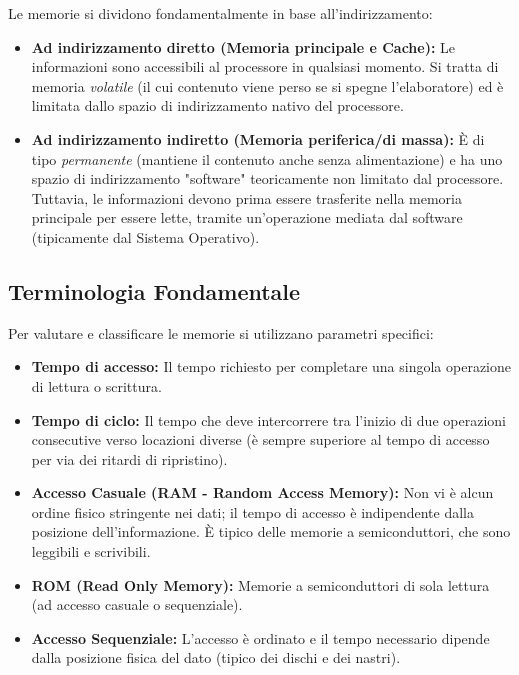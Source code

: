 \documentclass[12pt, a4paper]{article}
\begin{document}
Le memorie si dividono fondamentalmente in base all'indirizzamento:

\newpage

\begin{itemize}
    \item \textbf{Ad indirizzamento diretto (Memoria principale e Cache):} Le informazioni sono accessibili al processore in qualsiasi momento. Si tratta di memoria \textit{volatile} (il cui contenuto viene perso se si spegne l'elaboratore) ed è limitata dallo spazio di indirizzamento nativo del processore.
    \item \textbf{Ad indirizzamento indiretto (Memoria periferica/di massa):} È di tipo \textit{permanente} (mantiene il contenuto anche senza alimentazione) e ha uno spazio di indirizzamento "software" teoricamente non limitato dal processore. Tuttavia, le informazioni devono prima essere trasferite nella memoria principale per essere lette, tramite un'operazione mediata dal software (tipicamente dal Sistema Operativo).
\end{itemize}

\subsection{Terminologia Fondamentale}
Per valutare e classificare le memorie si utilizzano parametri specifici:
\begin{itemize}
    \item \textbf{Tempo di accesso:} Il tempo richiesto per completare una singola operazione di lettura o scrittura.
    \item \textbf{Tempo di ciclo:} Il tempo che deve intercorrere tra l'inizio di due operazioni consecutive verso locazioni diverse (è sempre superiore al tempo di accesso per via dei ritardi di ripristino).
    \item \textbf{Accesso Casuale (RAM - Random Access Memory):} Non vi è alcun ordine fisico stringente nei dati; il tempo di accesso è indipendente dalla posizione dell'informazione. È tipico delle memorie a semiconduttori, che sono leggibili e scrivibili.
    \item \textbf{ROM (Read Only Memory):} Memorie a semiconduttori di sola lettura (ad accesso casuale o sequenziale).
    \item \textbf{Accesso Sequenziale:} L'accesso è ordinato e il tempo necessario dipende dalla posizione fisica del dato (tipico dei dischi e dei nastri).
\end{itemize}
\end{document}
